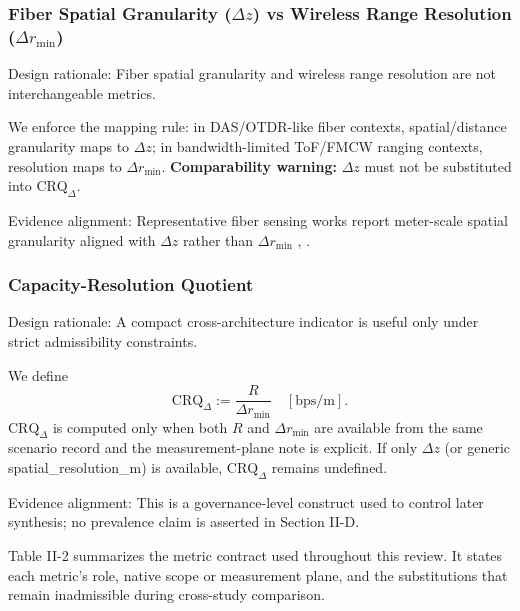 \subsubsection{Fiber Spatial Granularity (\(\Delta z\)) vs Wireless Range Resolution (\(\Delta r_{\min}\))}
Design rationale: Fiber spatial granularity and wireless range resolution are not interchangeable metrics.

We enforce the mapping rule: in DAS/OTDR-like fiber contexts, spatial/distance granularity maps to \(\Delta z\); in bandwidth-limited ToF/FMCW ranging contexts, resolution maps to \(\Delta r_{\min}\). \textbf{Comparability warning:} \(\Delta z\) must not be substituted into \(\mathrm{CRQ}_{\Delta}\).

Evidence alignment: Representative fiber sensing works report meter-scale spatial granularity aligned with \(\Delta z\) rather than \(\Delta r_{\min}\) \cite{O_ISAC_006}, \cite{O_ISAC_013}.

\subsubsection{Capacity-Resolution Quotient}
Design rationale: A compact cross-architecture indicator is useful only under strict admissibility constraints.

We define
\[
\mathrm{CRQ}_{\Delta} := \frac{R}{\Delta r_{\min}} \quad [\mathrm{bps/m}].
\]
\(\mathrm{CRQ}_{\Delta}\) is computed only when both \(R\) and \(\Delta r_{\min}\) are available from the same scenario record and the measurement-plane note is explicit. If only \(\Delta z\) (or generic spatial\_resolution\_m) is available, \(\mathrm{CRQ}_{\Delta}\) remains undefined.

Evidence alignment: This is a governance-level construct used to control later synthesis; no prevalence claim is asserted in Section II-D.

Table II-2 summarizes the metric contract used throughout this review. It states each metric's role, native scope or measurement plane, and the substitutions that remain inadmissible during cross-study comparison.

